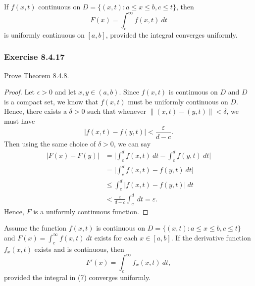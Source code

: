 \begin{theorem}
    If \( f(x,t)  \) continuous on \( D = \{ (x,t) : a \leq x \leq b , c \leq t  \}  \), then 
    \[  F(x) = \int_{ c }^{ \infty  } f(x,t) \ dt \] is uniformly continuous on \( [a,b]  \), provided the integral converges uniformly.
\end{theorem}

\subsubsection{Exercise 8.4.17} Prove Theorem 8.4.8.
\begin{proof}
Let \( \epsilon > 0  \) and let \( x, y \in (a,b)  \). Since \( f(x,t)  \) is continuous on \( D  \) and \( D  \) is a compact set, we know that \( f(x,t)  \) must be uniformly continuous on \( D  \). Hence, there exists a \( \delta > 0  \) such that whenever \( \lVert (x,t) - (y,t) \rVert < \delta  \), we must have 
\[  | f(x,t) - f(y,t)  | < \frac{ \varepsilon }{  d -c  }. \] 
Then using the same choice of \( \delta > 0  \), we can say
\begin{align*}
   | F(x) - F(y)  |  &= \Big| \int_{ c }^{ d } f(x,t) \ dt - \int_{ c }^{ d } f(y,t) \ dt    \Big|  \\
                     &= \Big| \int_{ c }^{ d } f(x,t)  - f(y,t) \ dt  \Big| \\
                     &\leq \int_{ c }^{ d }  | f(x,t) - f(y,t)  | \  dt \\
                     &< \frac{ \varepsilon }{ d - c  } \int_{ c }^{ d }  \ dt = \varepsilon.
\end{align*}
Hence, \( F  \) is a uniformly continuous function.
\end{proof}

\begin{theorem}
    Assume the function \( f(x,t)  \) is continuous on \( D = \{ (x,t) : a \leq x \leq b , c \leq t  \}  \) and \( F(x) = \int_{ c }^{ \infty  } f(x,t) \ dt  \) exists for each  \(  x \in [a,b]  \). If the derivative function \( f_{x}(x,t)  \) exists and is continuous, then 
    \[  F'(x) = \int_{ c  }^{ \infty  }  f_{x}(x,t) \ dt, \]
    provided the integral in (7) converges uniformly.
\end{theorem}

